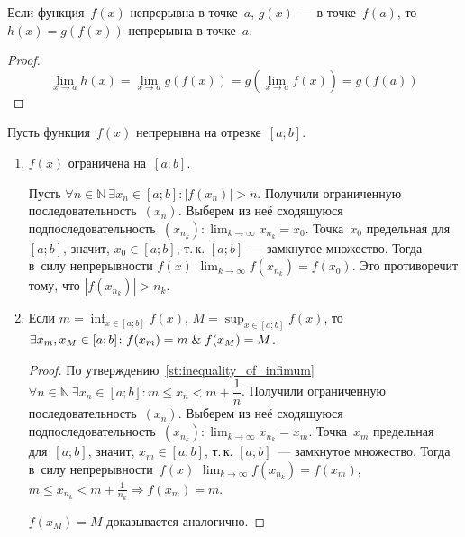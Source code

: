 \begin{statement}
Если функция~$f(x)$ непрерывна в точке~$a$, $g(x)$~--- в точке~$f(a)$, то $h(x) = g(f(x))$ непрерывна в точке~$a$.
\end{statement}
\begin{proof}
\begin{equation*}
\lim_{x \to a} h(x) = \lim_{x \to a} g(f(x)) = g(\lim_{x \to a} f(x)) = g(f(a))
\end{equation*}
\end{proof}

Пусть функция~$f(x)$ непрерывна на отрезке~$[a; b]$.
\begin{enumerate}
	\item $f(x)$ ограничена на~$[a; b]$.
	\begin{proofcontra}
	Пусть $\forall n \in \mathbb N \ \exists x_n \in [a; b] \colon |f(x_n)| > n$.
	Получили ограниченную последовательность~$(x_n)$.
	Выберем из неё сходящуюся подпоследовательность~$\displaystyle (x_{n_k}) \colon \lim_{k \to \infty} x_{n_k} = x_0$.
	Точка~$x_0$ предельная для~$[a; b]$, значит, $x_0 \in [a; b]$, т.\,к. $[a; b]$~--- замкнутое множество.
	Тогда в~силу непрерывности $f(x)$ $\displaystyle \lim_{k \to \infty} f(x_{n_k}) = f(x_0)$.
	Это противоречит тому, что $|f(x_{n_k})| > n_k$.
	\end{proofcontra}
	
	\item \label{st:continuous_function_takes_inf_and_sup} Если $\displaystyle m = \inf_{x \in [a; b]} f(x)$, $\displaystyle M = \sup_{x \in [a; b]} f(x)$, то
	$\exists x_m, x_M \in [a; b] \colon f(x_m) = m \mathrel{\&} f(x_M) = M$.
	\begin{proof}
	По утверждению~\ref{st:inequality_of_infimum} $\forall n \in \mathbb N \ \exists x_n \in [a; b] \colon m \leqslant x_n < m + \dfrac1n$.
	Получили ограниченную последовательность~$(x_n)$.
	Выберем из неё сходящуюся подпоследовательность~$\displaystyle (x_{n_k}) \colon \lim_{k \to \infty} x_{n_k} = x_m$.
	Точка~$x_m$ предельная для~$[a; b]$, значит, $x_m \in [a; b]$, т.\,к. $[a; b]$~--- замкнутое множество.
	Тогда в~силу непрерывности~$f(x)$ $\displaystyle \lim_{k \to \infty} f(x_{n_k}) = f(x_m)$, $\displaystyle m \leqslant x_{n_k} < m + \frac1{n_k} \Rightarrow f(x_m) = m$.
	
	$f(x_M) = M$ доказывается аналогично.
	\end{proof}
	

\end{enumerate}
